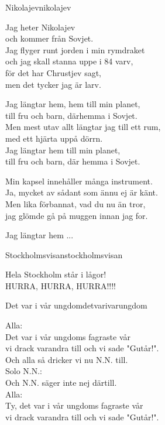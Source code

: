 \begin{song}{Nikolajev}{nikolajev}
\begin{vers}
Jag heter Nikolajev\\
och kommer från Sovjet.\\
Jag flyger runt jorden i min rymdraket\\
och jag skall stanna uppe i 84 varv,\\
för det har Chrustjev sagt,\\
men det tycker jag är larv.\\
\end{vers}
\begin{vers}
Jag längtar hem, hem till min planet,\\
till fru och barn, därhemma i Sovjet.\\
Men mest utav allt längtar jag till ett rum,\\
med ett hjärta uppå dörrn.\\
Jag längtar hem till min planet,\\
till fru och barn, där hemma i Sovjet.\\
\end{vers}
\begin{vers}
Min kapsel innehåller många instrument.\\
Ja, mycket av sådant som ännu ej är känt.\\
Men lika förbannat, vad du nu än tror,\\
jag glömde gå på muggen innan jag for.\\
\end{vers}
\begin{vers}
Jag längtar hem ...\\
\end{vers}
\end{song}

\begin{song}{Stockholmsvisan}{stockholmsvisan}
\begin{vers}
Hela Stockholm står i lågor!\\
HURRA, HURRA, HURRA!!!!\\
\end{vers}
\end{song}

\newpage


\begin{song}{Det var i vår ungdom}{detvarivarungdom}
\begin{vers}
Alla:\\
Det var i vår ungdoms fagraste vår\\
vi drack varandra till och vi sade "Gutår!".\\
Och alla så dricker vi nu N.N. till.\\
Solo N.N.:\\
Och N.N. säger inte nej därtill.\\
Alla:\\
Ty, det var i vår ungdoms fagraste vår\\
vi drack varandra till och vi sade "Gutår!".\\
\end{vers}
\end{song}

